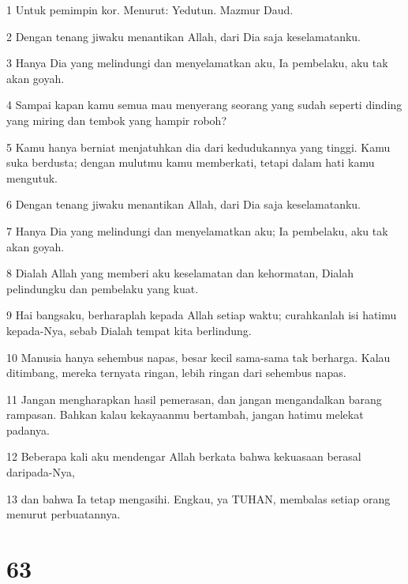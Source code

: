\par 1 Untuk pemimpin kor. Menurut: Yedutun. Mazmur Daud.
\par 2 Dengan tenang jiwaku menantikan Allah, dari Dia saja keselamatanku.
\par 3 Hanya Dia yang melindungi dan menyelamatkan aku, Ia pembelaku, aku tak akan goyah.
\par 4 Sampai kapan kamu semua mau menyerang seorang yang sudah seperti dinding yang miring dan tembok yang hampir roboh?
\par 5 Kamu hanya berniat menjatuhkan dia dari kedudukannya yang tinggi. Kamu suka berdusta; dengan mulutmu kamu memberkati, tetapi dalam hati kamu mengutuk.
\par 6 Dengan tenang jiwaku menantikan Allah, dari Dia saja keselamatanku.
\par 7 Hanya Dia yang melindungi dan menyelamatkan aku; Ia pembelaku, aku tak akan goyah.
\par 8 Dialah Allah yang memberi aku keselamatan dan kehormatan, Dialah pelindungku dan pembelaku yang kuat.
\par 9 Hai bangsaku, berharaplah kepada Allah setiap waktu; curahkanlah isi hatimu kepada-Nya, sebab Dialah tempat kita berlindung.
\par 10 Manusia hanya sehembus napas, besar kecil sama-sama tak berharga. Kalau ditimbang, mereka ternyata ringan, lebih ringan dari sehembus napas.
\par 11 Jangan mengharapkan hasil pemerasan, dan jangan mengandalkan barang rampasan. Bahkan kalau kekayaanmu bertambah, jangan hatimu melekat padanya.
\par 12 Beberapa kali aku mendengar Allah berkata bahwa kekuasaan berasal daripada-Nya,
\par 13 dan bahwa Ia tetap mengasihi. Engkau, ya TUHAN, membalas setiap orang menurut perbuatannya.

\chapter{63}

